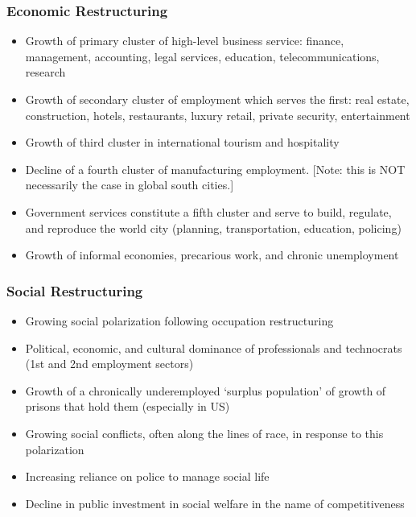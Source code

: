 \documentclass[11pt]{article}
\begin{document}
\subsubsection{Economic Restructuring}
\begin{itemize}
\item Growth of primary cluster of high-level business service: finance, management, accounting, legal services, education, telecommunications, research
\item Growth of secondary cluster of employment which serves the first: real estate, construction, hotels, restaurants, luxury retail, private security, entertainment
\item Growth of third cluster in international tourism and hospitality
\item Decline of a fourth cluster of manufacturing employment. [Note: this is NOT necessarily the case in global south cities.]
\item Government services constitute a fifth cluster and serve to build, regulate, and reproduce the world city (planning, transportation, education, policing)
\item Growth of informal economies, precarious work, and chronic unemployment
\end{itemize}

\subsubsection{Social Restructuring}
\begin{itemize}
\item Growing social polarization following occupation restructuring
\item Political, economic, and cultural dominance of professionals and technocrats (1st and 2nd employment sectors)
\item Growth of a chronically underemployed ‘surplus population’ of growth of prisons that hold them (especially in US)
\item Growing social conflicts, often along the lines of race, in response to this polarization
\item Increasing reliance on police to manage social life 
\item Decline in public investment in social welfare in the name of competitiveness
\end{itemize}
\end{document}
